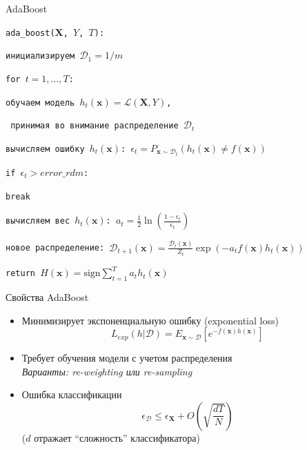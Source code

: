 \documentclass[10pt,a4paper]{beamer}
\begin{document}
\begin{frame}{AdaBoost}

\texttt{ada\_boost($\mathbf{X}$, $Y$, $T$):}

\texttt{\quad инициализируем $\mathcal{D}_1 = 1/m$}

\texttt{\quad for $t = 1, \ldots, T$:}

\texttt{\quad\quad обучаем модель $h_t(\mathbf{x}) = \mathcal{L}(\mathbf{X}, Y)$,}

\texttt{\quad\quad\; принимая во внимание распределение $\mathcal{D}_t$}

\texttt{\quad\quad вычисляем ошибку $h_t(\mathbf{x})$: $\epsilon_t = P_{\mathbf{x} \sim \mathcal{D}_t}(h_t(\mathbf{x}) \neq f(\mathbf{x}))$}

\texttt{\quad\quad if $\epsilon_t > error\_rdm$:} 

\texttt{\quad\quad\quad break}

\texttt{\quad\quad вычисляем  вес $h_t(\mathbf{x})$: $a_t = \frac 1 2 \ln(\frac{1-\epsilon_t}{\epsilon_t})$}

\texttt{\quad\quad новое распределение: $\mathcal{D}_{t+1}(\mathbf{x}) = \frac{\mathcal{D}_t(\mathbf{x})}{Z_t} \exp(- a_t f(\mathbf{x}) h_t(\mathbf{x})) $}

\texttt{\quad return $H(\mathbf{x}) = \text{sign} \sum_{t=1}^T a_t h_t(\mathbf{x})$}

\end{frame}


\begin{frame}{Свойства AdaBoost}

\begin{itemize}
\item Минимизирует экспоненциальную ошибку (exponential loss)
\[
L_{exp}(h | \mathcal{D}) = E_{\mathbf{x} \sim \mathcal{D}} [e^{-f(\mathbf{x})h(\mathbf{x})}]
\]
\item Требует обучения модели с учетом распределения \\
{\it Варианты: re-weighting или re-sampling}
\item Ошибка классификации
\[
\epsilon_\mathcal{D} \leq \epsilon_{\mathbf{X}} + O \left(\sqrt{\frac{dT}{N}}\right)
\]
($d$ отражает ``сложность'' классификатора)
\end{itemize}

\end{frame}

\end{document}
